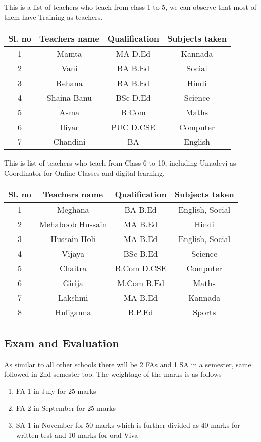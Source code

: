 This is a list of teachers who teach from class 1 to 5, we can observe that most of them have Training as teachers.
\begin{table}[H]
    \centering
    \begin{tabular}{c|c|c|c}\bottomrule \toprule 
        Sl. no & Teachers name & Qualification & Subjects taken\\ \bottomrule \toprule
        1 & Mamta & MA D.Ed & Kannada \\ \hline 
        2 & Vani & BA B.Ed & Social \\ \hline 
        3 & Rehana & BA B.Ed & Hindi \\ \hline 
        4 & Shaina Banu & BSc D.Ed & Science \\ \hline 
        5 & Asma & B Com & Maths \\ \hline 
        6 & Iliyar & PUC D.CSE & Computer \\ \hline 
        7 & Chandini & BA & English \\ \bottomrule\toprule
    \end{tabular}
\end{table}
\newpage
This is list of teachers who teach from Class 6 to 10, including Umadevi as Coordinator for Online Classes and digital learning. 
\begin{table}[H]
    \centering
    \begin{tabular}{c|c|c|c}\bottomrule \toprule 
        Sl. no & Teachers name & Qualification & Subjects taken\\ \bottomrule \toprule
        1 & Meghana & BA B.Ed & English, Social \\ \hline 
        2 & Mehaboob Hussain & MA B.Ed & Hindi \\ \hline 
        3 & Hussain Holi & MA B.Ed & English, Social \\ \hline 
        4 & Vijaya & BSc B.Ed & Science \\ \hline 
        5 & Chaitra & B.Com D.CSE & Computer \\ \hline 
        6 & Girija & M.Com B.Ed & Maths \\ \hline 
        7 & Lakshmi & MA B.Ed & Kannada \\ \hline 
        8 & Huliganna & B.P.Ed & Sports\\ \bottomrule\toprule
    \end{tabular}
\end{table} 
\subsection{Exam and Evaluation}
As similar to all other schools there will be 2 FAs and 1 SA in a semester, same followed in 2nd semester too. The weightage of the marks is as follows
\begin{enumerate}
    \item FA 1 in July for 25 marks
    \item FA 2 in September for 25 marks
    \item SA 1 in November for 50 marks which is further divided as 40 marks for written test and 10 marks for oral Viva 
\end{enumerate}
